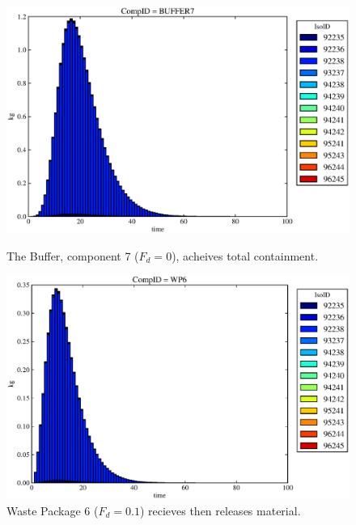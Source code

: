 \begin{figure}[ht]
\begin{minipage}[b]{0.45\linewidth}
  \includegraphics[width=\textwidth]{./chapters/demonstration/no_release/mcIII3.eps}
  \caption[Case MCI Buffer Contaminants]{
    The Buffer, component 7 ($F_d=0$), acheives total containment.
    }
  \label{fig:mcIIIbuff}

\end{minipage}
\hspace{0.05\linewidth}
\begin{minipage}[b]{0.45\linewidth}
  \includegraphics[width=\textwidth]{./chapters/demonstration/no_release/mcIII2.eps}
  \caption[Case MCI Waste Package Contaminants.]{ 
    Waste Package 6 ($F_d = 0.1$) recieves then releases material. 
    }
  \label{fig:mcIIIwp6}


\end{minipage}
\end{figure}
